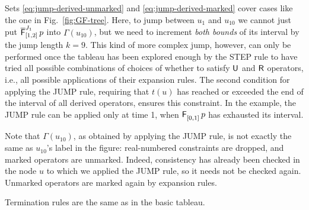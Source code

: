 \documentclass[acmsmall,screen]{acmart}
\begin{document}
Sets \eqref{eq:jump-derived-unmarked} and \eqref{eq:jump-derived-marked} cover
cases like the one in Fig.~\ref{fig:GF-tree}.
Here, to jump between $u_1$ and $u_{10}$ we cannot just put $\meven[J_1]{[1,2]} p$
into $\Gamma(u_{10})$, but we need to increment \emph{both bounds} of its interval by the jump length $k = 9$.
This kind of more complex jump, however, can only be performed once the tableau
has been explored enough by the \textsf{STEP} rule to have tried all possible combinations
of choices of whether to satisfy $\untilop$ and $\releaseop$ operators,
i.e., all possible applications of their expansion rules.
The second condition for applying the \textsf{JUMP} rule,
requiring that $t(u)$ has reached or exceeded the end of the interval of all derived operators,
ensures this constraint.
In the example, the \textsf{JUMP} rule can be applied only at time 1,
when $\even{[0,1]} p$ has exhausted its interval.

Note that $\Gamma(u_{10})$, as obtained by applying the \textsf{JUMP} rule,
is not exactly the same as $u_{10}$'s label in the figure:
real-numbered constraints are dropped, and marked operators are unmarked.
Indeed, consistency has already been checked in the node $u$
to which we applied the \textsf{JUMP} rule,
so it needs not be checked again.
Unmarked operators are marked again by expansion rules.

Termination rules are the same as in the basic tableau.

\end{document}

